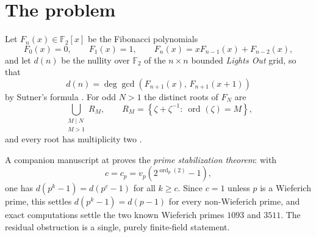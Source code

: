 \documentclass[a4paper]{article}
\newcommand{\F}{\mathbb{F}}
\newcommand{\ord}[2][]{\operatorname{ord}_{#1}\!\left(#2\right)}
\DeclareMathOperator{\Tr}{Tr}
\begin{document}
\begin{abstract}
	Genuinely additive input does prove new cases.  The Artin--Schreier law
	$\Tr(\bar\lambda_x^{-1})=\delta$ and the global law
	$\Tr(\theta^x)+\Tr(\theta^y)=\ord[p^j]{2}\bmod2$ exclude several
	families, including $d(3510)=d(72)=d(88)=d(232)=0$.  At the opposite
	extreme, the Mersenne and Fermat cases admit exact binary Kloosterman
	formulas.  The statement is false in other residue characteristics, so
	any proof must use characteristic-two additive structure.  Exact
	searches verify the endpoint for both known base-$2$ Wieferich primes,
	$1093$ and $3511$, and a complete resultant computation settles
	$p^j=49$.  No proof is presently known for a hypothetical new
	Wieferich endpoint.
\end{abstract}

\tableofcontents

\section{The problem}\label{sec:problem}

Let $F_n(x)\in\F_2[x]$ be the Fibonacci polynomials
\[
	F_0(x)=0,\qquad F_1(x)=1,\qquad F_n(x)=xF_{n-1}(x)+F_{n-2}(x),
\]
and let $d(n)$ be the nullity over $\F_2$ of the $n\times n$ bounded
\textit{Lights Out} grid, so that
\begin{equation}\label{eq:sutner}
	d(n)=\deg\gcd\!\left(F_{n+1}(x),\,F_{n+1}(x+1)\right)
\end{equation}
by Sutner's formula \cite{Sutner00sigma-automataand}.
For odd $N>1$ the distinct roots of $F_N$ are
\begin{equation}\label{eq:strata}
	\bigcup_{\substack{M\mid N\\M>1}}R_M,
	\qquad
	R_M=\left\{\zeta+\zeta^{-1}:\ \ord{\zeta}=M\right\},
\end{equation}
and every root has multiplicity two \cite{HUNZIKER2004465}.

A companion manuscript at  proves
the \emph{prime stabilization theorem}: with
\begin{equation}\label{eq:c}
	c=c_p=v_p\!\left(2^{\ord[p]{2}}-1\right),
\end{equation}
one has $d(p^k-1)=d(p^c-1)$ for all $k\geq c$.
Since $c=1$ unless $p$ is a Wieferich prime, this settles
$d(p^k-1)=d(p-1)$ for every non-Wieferich prime, and exact computations
settle the two known Wieferich primes $1093$ and $3511$.
The residual obstruction is a single, purely finite-field statement.
\end{document}
